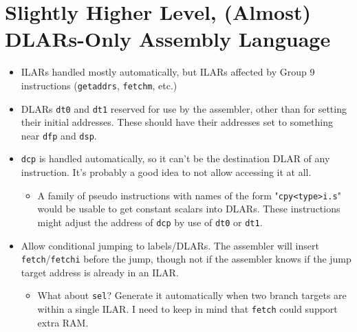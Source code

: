 \documentclass{article}
\begin{document}
\section{Slightly Higher Level, (Almost) DLARs-Only Assembly Language}
	\begin{itemize}
	\item ILARs handled mostly automatically, but ILARs affected by Group 9
		instructions (\texttt{getaddrs}, \texttt{fetchm}, etc.)
	\item DLARs \texttt{dt0} and \texttt{dt1} reserved for use by the
		assembler, other than for setting their initial addresses. These
		should have their addresses set to something near \texttt{dfp} and
		\texttt{dsp}.
	\item \texttt{dcp} is handled automatically, so it can't be the
		destination DLAR of any instruction. It's probably a good idea to
		not allow accessing it at all.
		\begin{itemize}
		\item A family of pseudo instructions with names of the form
			"\texttt{cpy<type>i.s}" would be usable to get constant scalars
			into DLARs. These instructions might adjust the address of
			\texttt{dcp} by use of \texttt{dt0} or \texttt{dt1}.
		\end{itemize}
	\item Allow conditional jumping to labels/DLARs.
		The assembler will insert \texttt{fetch}/\texttt{fetchi} before the
		jump, though not if the assembler knows if the jump target address
		is already in an ILAR.
		\begin{itemize}
		\item What about \texttt{sel}? Generate it automatically when two
			branch targets are within a single ILAR. I need to keep in mind
			that \texttt{fetch} could support extra RAM.
		\end{itemize}
	\end{itemize}
\end{document}
